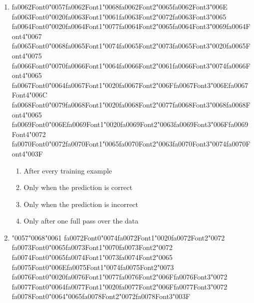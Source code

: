 \documentclass[12pt]{article}
\begin{document}
\begin{enumerate}[label=Q\arabic*.]
\item {\csname fa0062Font0\endcsname\char"0057}{\csname fa0062Font1\endcsname\char"0068}{\csname fa0062Font2\endcsname\char"0065}{\csname fa0062Font3\endcsname\char"006E} {\csname fa0063Font0\endcsname\char"0020}{\csname fa0063Font1\endcsname\char"0061}{\csname fa0063Font2\endcsname\char"0072}{\csname fa0063Font3\endcsname\char"0065} {\csname fa0064Font0\endcsname\char"0020}{\csname fa0064Font1\endcsname\char"0077}{\csname fa0064Font2\endcsname\char"0065}{\csname fa0064Font3\endcsname\char"0069}{\csname fa0064Font4\endcsname\char"0067} {\csname fa0065Font0\endcsname\char"0068}{\csname fa0065Font1\endcsname\char"0074}{\csname fa0065Font2\endcsname\char"0073}{\csname fa0065Font3\endcsname\char"0020}{\csname fa0065Font4\endcsname\char"0075} {\csname fa0066Font0\endcsname\char"0070}{\csname fa0066Font1\endcsname\char"0064}{\csname fa0066Font2\endcsname\char"0061}{\csname fa0066Font3\endcsname\char"0074}{\csname fa0066Font4\endcsname\char"0065} {\csname fa0067Font0\endcsname\char"0064}{\csname fa0067Font1\endcsname\char"0020}{\csname fa0067Font2\endcsname\char"006F}{\csname fa0067Font3\endcsname\char"006E}{\csname fa0067Font4\endcsname\char"006C} {\csname fa0068Font0\endcsname\char"0079}{\csname fa0068Font1\endcsname\char"0020}{\csname fa0068Font2\endcsname\char"0077}{\csname fa0068Font3\endcsname\char"0068}{\csname fa0068Font4\endcsname\char"0065} {\csname fa0069Font0\endcsname\char"006E}{\csname fa0069Font1\endcsname\char"0020}{\csname fa0069Font2\endcsname\char"0063}{\csname fa0069Font3\endcsname\char"006F}{\csname fa0069Font4\endcsname\char"0072} {\csname fa0070Font0\endcsname\char"0072}{\csname fa0070Font1\endcsname\char"0065}{\csname fa0070Font2\endcsname\char"0063}{\csname fa0070Font3\endcsname\char"0074}{\csname fa0070Font4\endcsname\char"003F}
\begin{enumerate}[label=(\Alph*)]
    \item After every training example
    \item Only when the prediction is correct
    \item Only when the prediction is incorrect
    \item Only after one full pass over the data
\end{enumerate}
\item {\char"0057}{\char"0068}{\char"0061} {\csname fa0072Font0\endcsname\char"0074}{\csname fa0072Font1\endcsname\char"0020}{\csname fa0072Font2\endcsname\char"0072} {\csname fa0073Font0\endcsname\char"0065}{\csname fa0073Font1\endcsname\char"0070}{\csname fa0073Font2\endcsname\char"0072} {\csname fa0074Font0\endcsname\char"0065}{\csname fa0074Font1\endcsname\char"0073}{\csname fa0074Font2\endcsname\char"0065} {\csname fa0075Font0\endcsname\char"006E}{\csname fa0075Font1\endcsname\char"0074}{\csname fa0075Font2\endcsname\char"0073} {\csname fa0076Font0\endcsname\char"0020}{\csname fa0076Font1\endcsname\char"0077}{\csname fa0076Font2\endcsname\char"006F}{\csname fa0076Font3\endcsname\char"0072} {\csname fa0077Font0\endcsname\char"0064}{\csname fa0077Font1\endcsname\char"0020}{\csname fa0077Font2\endcsname\char"006F}{\csname fa0077Font3\endcsname\char"0072} {\csname fa0078Font0\endcsname\char"0064}{\char"0065}{\csname fa0078Font2\endcsname\char"0072}{\csname fa0078Font3\endcsname\char"003F}

\end{enumerate}
\end{document}
